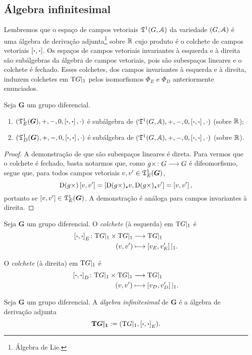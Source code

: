 \subsection{Álgebra infinitesimal}

Lembremos que o espaço de campos vetoriais $\mathfrak{T}^1(G,\mathcal{A})$ da variedade $(G,\mathcal{A})$ é uma álgebra de derivação adjunta\footnote{Álgebra de Lie.} sobre $\mathbb{R}$ cujo produto é o colchete de campos vetoriais $\left[{\bm{\cdot}},{\bm{\cdot}}\right]$. Os espaços de campos vetoriais invariantes à esquerda e à direita são subálgebras da álgebra de campos vetoriais, pois são subespaços lineares e o colchete é fechado. Esses colchetes, dos campos invariantes à esquerda e à direita, induzem colchetes em $\mathrm{T} G|_1$ pelos isomorfismos $\Phi_E$ e $\Phi_D$ anteriormente enunciados.

\begin{proposition}
Seja $\bm G$ um grupo diferencial.
	\begin{enumerate}
	\item $(\mathfrak{T}^1_E(\bm G),+,-,0,\left[{\bm{\cdot}},{\bm{\cdot}}\right],\cdot)$ é subálgebra de $(\mathfrak{T}^1(G,\mathcal{A}),+,-,0,\left[{\bm{\cdot}},{\bm{\cdot}}\right],\cdot)$ (sobre $\mathbb{R}$);
	\item $(\mathfrak{T}^1_D(\bm G),+,-,0,\left[{\bm{\cdot}},{\bm{\cdot}}\right],\cdot)$ é subálgebra de $(\mathfrak{T}^1(G,\mathcal{A}),+,-,0,\left[{\bm{\cdot}},{\bm{\cdot}}\right],\cdot)$ (sobre $\mathbb{R}$).
	\end{enumerate}
\end{proposition}
\begin{proof}
A demonstração de que são subespaços lineares é direta. Para vermos que o colchete é fechado, basta notarmos que, como ${g\times}\colon {G} \longrightarrow {G}$ é difeomorfismo, segue que, para todos campos vetoriais $v,v' \in \mathfrak{T}^1_E(\bm G)$,
	\begin{equation*}
	\mathrm{D} (g\times)\left[{v},{v'}\right] = \left[{\mathrm{D}(g \times)_\star v},{\mathrm{D}(g \times)_\star v'}\right] = \left[{v},{v'}\right],
	\end{equation*}
portanto se $\left[{v},{v'}\right] \in \mathfrak{T}^1_E(\bm G)$. A demonstração é análoga para campos invariantes à direita.
\end{proof}

\begin{definition}
Seja $\bm G$ um grupo diferencial. O \emph{colchete} (à esquerda) em $\mathrm{T} G|_1$ é
	\begin{align*}
	{\left[{\bm{\cdot}},{\bm{\cdot}}\right]_E}\colon {\mathrm{T}G|_1 \times \mathrm{T}G|_1} &\longrightarrow {\mathrm{T}G|_1} \\{(v,v')} &\longmapsto \left[{v_E},{v'_E}\right]|_1.
	\end{align*}

O \emph{colchete} (à direita) em $\mathrm{T} G|_1$ é
	\begin{align*}
	{\left[{\bm{\cdot}},{\bm{\cdot}}\right]_D}\colon {\mathrm{T}G|_1 \times \mathrm{T}G|_1} &\longrightarrow {\mathrm{T}G|_1} \\{(v,v')} &\longmapsto \left[{v_D},{v'_D}\right]|_1.
	\end{align*}
\end{definition}

\begin{definition}
Seja $\bm G$ um grupo diferencial. A \emph{álgebra infinitesimal} de $\bm G$ é a álgebra de derivação adjunta
	\begin{equation*}
	\bm{\mathrm{T} G|_1} := (\mathrm{T} G|_1,\left[{\bm{\cdot}},{\bm{\cdot}}\right]_E).
	\end{equation*}
\end{definition}

